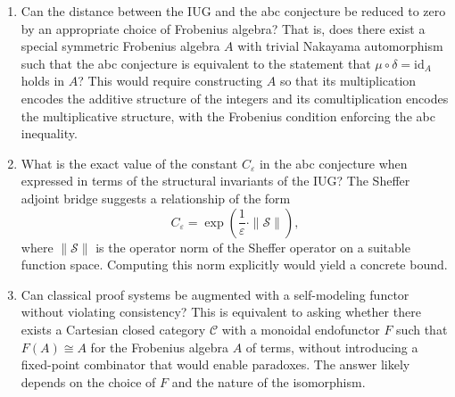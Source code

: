 \documentclass{article}
\begin{document}
\begin{enumerate}
\item Can the distance between the IUG and the abc conjecture be reduced to zero by an appropriate choice of Frobenius algebra? That is, does there exist a special symmetric Frobenius algebra $A$ with trivial Nakayama automorphism such that the abc conjecture is equivalent to the statement that $\mu \circ \delta = \text{id}_A$ holds in $A$? This would require constructing $A$ so that its multiplication encodes the additive structure of the integers and its comultiplication encodes the multiplicative structure, with the Frobenius condition enforcing the abc inequality.

\item What is the exact value of the constant $C_\varepsilon$ in the abc conjecture when expressed in terms of the structural invariants of the IUG? The Sheffer adjoint bridge suggests a relationship of the form
\[
C_\varepsilon = \exp\left( \frac{1}{\varepsilon} \cdot \|\mathcal{S}\| \right),
\]
where $\|\mathcal{S}\|$ is the operator norm of the Sheffer operator on a suitable function space. Computing this norm explicitly would yield a concrete bound.

\item Can classical proof systems be augmented with a self-modeling functor without violating consistency? This is equivalent to asking whether there exists a Cartesian closed category $\mathcal{C}$ with a monoidal endofunctor $F$ such that $F(A) \cong A$ for the Frobenius algebra $A$ of terms, without introducing a fixed-point combinator that would enable paradoxes. The answer likely depends on the choice of $F$ and the nature of the isomorphism.
\end{enumerate}
\end{document}
